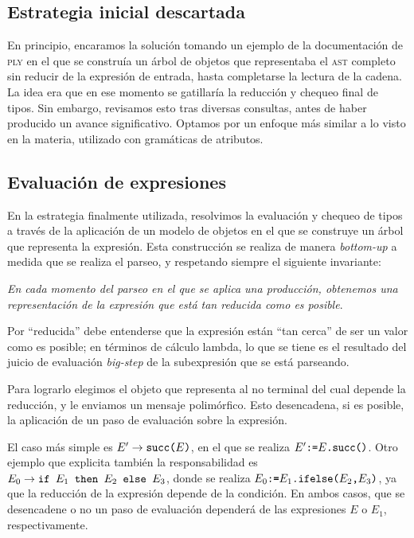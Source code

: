 \documentclass[11pt]{article}
\begin{document}
\subsection{Estrategia inicial descartada}
En principio, encaramos la solución tomando un ejemplo de la documentación de  \textsc{ply}\cite{ply-docs} en el que se construía un árbol de objetos que representaba el \textsc{ast} completo sin reducir de la expresión de entrada, hasta completarse la lectura de la cadena. La idea era que en ese momento se gatillaría la reducción y chequeo final de tipos. Sin embargo, revisamos esto tras diversas consultas, antes de haber producido un avance significativo. Optamos por un enfoque más similar a lo visto en la materia, utilizado con gramáticas de atributos.

\subsection{Evaluación de expresiones}
\label{sec:reduccion}

En la estrategia finalmente utilizada, resolvimos la evaluación y chequeo de tipos a través de la aplicación de un modelo de objetos en el que se construye un árbol que representa la expresión. Esta construcción se realiza de manera \emph{bottom-up} a medida que se realiza el parseo, y respetando siempre el siguiente invariante:

\emph{En cada momento del parseo en el que se aplica una producción, obtenemos una representación de la expresión que está tan reducida como es posible}.

Por ``reducida'' debe entenderse que la expresión están ``tan cerca'' de ser un
valor como es posible; en términos de cálculo lambda, lo que se tiene es el
resultado del juicio de evaluación \emph{big-step} de la subexpresión que
se está parseando.

Para lograrlo elegimos el objeto que representa al no terminal del cual depende la reducción, y le enviamos un mensaje polimórfico. Esto desencadena, si es posible, la aplicación de un paso de evaluación sobre la expresión.

El caso más simple es $E' \rightarrow \verb|succ(|E\verb|)|$, en el que se realiza
$E' \verb|:=| E\verb|.succ()|$. Otro ejemplo que explicita también la responsabilidad es $E_0 \rightarrow \verb|if | E_1 \verb| then | E_2 \verb| else | E_3$, donde se realiza
$E_0 \verb|:=| E_1 \verb|.ifelse(| E_2 \verb|,| E_3 \verb|)|$, ya que la reducción de la expresión depende de la condición. En ambos casos, que se desencadene o no un paso de evaluación dependerá de las expresiones $E$ o $E_1$, respectivamente.
\end{document}
